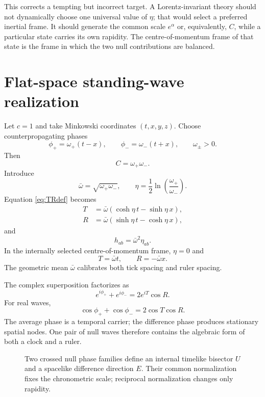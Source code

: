 \documentclass[11pt,a4paper]{article}
\newcommand{\Ccross}{C}
\begin{document}
This corrects a tempting but incorrect target. A Lorentz-invariant theory should not dynamically choose one universal value of $\eta$; that would select a preferred inertial frame. It should generate the common scale $e^\alpha$ or, equivalently, $\Ccross$, while a particular state carries its own rapidity. The centre-of-momentum frame of that state is the frame in which the two null contributions are balanced.

\section{Flat-space standing-wave realization}

Let $c=1$ and take Minkowski coordinates $(t,x,y,z)$. Choose counterpropagating phases
\begin{equation}
\phi_+=\omega_+(t-x),
\qquad
\phi_-=\omega_-(t+x),
\qquad \omega_\pm>0.
\label{eq:flatphases}
\end{equation}
Then
\[
\Ccross=\omega_+\omega_-.
\]
Introduce
\[
\bar\omega=\sqrt{\omega_+\omega_-},
\qquad
\eta=\frac12\ln\left(\frac{\omega_+}{\omega_-}\right).
\]
Equation \eqref{eq:TRdef} becomes
\begin{align}
T&=\bar\omega(\cosh\eta\,t-\sinh\eta\,x),\\
R&=\bar\omega(\sinh\eta\,t-\cosh\eta\,x),
\end{align}
and
\[
h_{ab}=\bar\omega^2\eta_{ab}.
\]
In the internally selected centre-of-momentum frame, $\eta=0$ and
\[
T=\bar\omega t,
\qquad
R=-\bar\omega x.
\]
The geometric mean $\bar\omega$ calibrates both tick spacing and ruler spacing.

The complex superposition factorizes as
\begin{equation}
\boxed{
e^{i\phi_+}+e^{i\phi_-}=2e^{iT}\cos R.
}
\label{eq:standingwave}
\end{equation}
For real waves,
\[
\cos\phi_++\cos\phi_-=2\cos T\cos R.
\]
The average phase is a temporal carrier; the difference phase produces stationary spatial nodes. One pair of null waves therefore contains the algebraic form of both a clock and a ruler.

\begin{figure}[ht]
\centering
{}
\caption{Two crossed null phase families define an internal timelike bisector $U$ and a spacelike difference direction $E$. Their common normalization fixes the chronometric scale; reciprocal normalization changes only rapidity.}
\end{figure}
\end{document}

